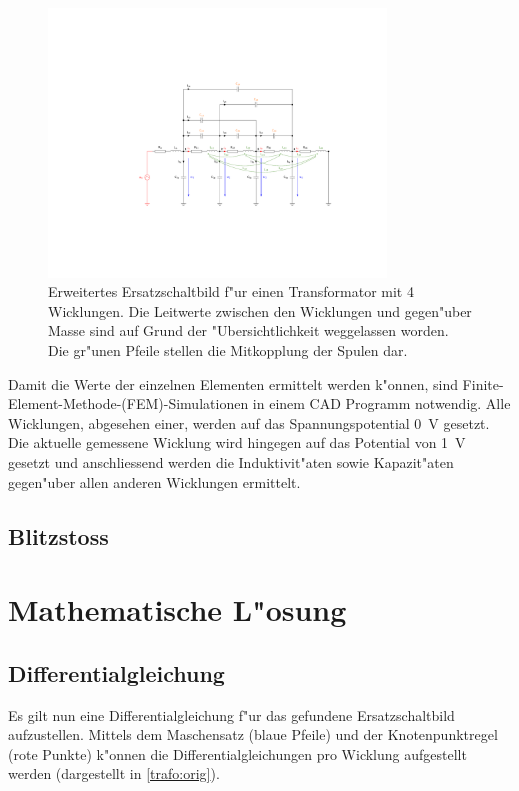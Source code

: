 \begin{refsection}
\begin{figure}
	\centering
	\includegraphics[width=0.8\textwidth]{./trafo/images/Trafo_Modell.pdf}
	\caption[Erweitertes Ersatzschaltbild f"ur einen Transformator]{Erweitertes Ersatzschaltbild f"ur einen Transformator mit 4 Wicklungen. Die Leitwerte zwischen den Wicklungen und gegen"uber Masse sind auf Grund der "Ubersichtlichkeit weggelassen worden. Die gr"unen Pfeile stellen die Mitkopplung der Spulen dar. }
	\label{trafo:erweitertes_ESB}
\end{figure}

Damit die Werte der einzelnen Elementen ermittelt werden k"onnen, sind Finite-Element-Methode-(FEM)-Simulationen in einem CAD Programm notwendig. Alle Wicklungen, abgesehen einer, werden auf das Spannungspotential \SI{0}{\volt} gesetzt. Die aktuelle gemessene Wicklung wird hingegen auf das Potential von \SI{1}{\volt} gesetzt und anschliessend werden die Induktivit"aten sowie Kapazit"aten gegen"uber allen anderen Wicklungen ermittelt.

\subsection{Blitzstoss}

\section{Mathematische L"osung}
\subsection{Differentialgleichung}

Es gilt nun eine Differentialgleichung f"ur das gefundene Ersatzschaltbild aufzustellen. Mittels dem Maschensatz (blaue Pfeile) und der Knotenpunktregel (rote Punkte) k"onnen die Differentialgleichungen pro Wicklung aufgestellt werden (dargestellt in \ref{trafo:orig}).


\end{refsection}
